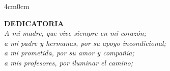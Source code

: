 \begin{adjustwidth}{4cm}{0cm}
  \begin{flushleft}
    \textbf{DEDICATORIA} \\
  \textit{A mi madre, que vive siempre en mi corazón;\\
  a mi padre y hermanas, por su apoyo incondicional;\\
  a mi prometida, por su amor y compañía;\\
  a mis profesores, por iluminar el camino;}
  \end{flushleft}
\end{adjustwidth}
\vspace{2cm} 
